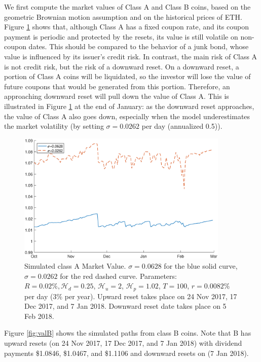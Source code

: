 \documentclass[final,pdftex]{ectaart}
\theoremstyle{plain}
\begin{document}
We first compute the market values of Class A and Class B coins, based on the geometric Brownian motion assumption and on the historical prices of ETH. Figure \ref{fig:valA} shows that, although Class A has a fixed coupon rate, and its coupon payment is periodic and protected by the resets, its value is still volatile on non-coupon dates. This should be compared to the behavior of a junk bond, whose value is influenced by its issuer's credit risk. In contrast, the main risk of Class A is not credit risk, but the risk of a downward reset. On a downward reset, a portion of Class A coins will be liquidated, so the investor will lose the value of future coupons that would be generated from this portion. Therefore, an approaching downward reset will pull down the value of Class A. This is illustrated in Figure \ref{fig:valA} at the end of January: as the downward reset approaches, the value of Class A also goes down, especially when the model underestimates the market volatility (by setting $\sigma=0.0262$ per day (annualized 0.5)).
\begin{figure}[htb]
\begin{centering}
\includegraphics[width=0.9\textwidth]{WA.eps}
\par\end{centering}
\caption{Simulated class A Market Value. $\sigma = 0.0628$ for the blue solid curve, $\sigma=0.0262$ for the red dashed curve. Parameters: $R=0.02\%,\mathcal{H}_{d}=0.25$, $\mathcal{H}_{u} =2$, $\mathcal{H}_{p}=1.02$, $T=100$, $r=0.0082\%$ per day ($3\%$ per year). Upward reset takes place on 24 Nov 2017, 17 Dec 2017, and 7 Jan 2018. Downward reset date takes place on 5 Feb 2018.}\label{fig:valA}
\end{figure}

Figure \ref{fig:valB} shows the simulated paths from class B coins. Note that B has upward resets (on 24 Nov 2017, 17 Dec 2017, and 7 Jan 2018) with dividend payments \$1.0846, \$1.0467, and \$1.1106 and downward resets on (7 Jan 2018).
\end{document}

